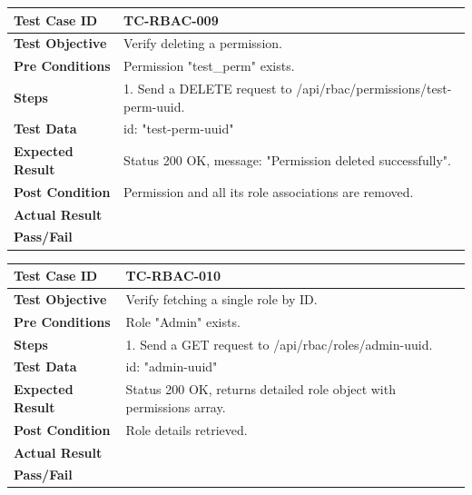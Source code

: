 \begin{longtable}{|p{}|p{}|}
\hline
\textbf{Test Case ID} & TC-RBAC-009 \\ \hline
\textbf{Test Objective} & Verify deleting a permission. \\ \hline
\textbf{Pre Conditions} & Permission "test_perm" exists. \\ \hline
\textbf{Steps} & 
1. Send a DELETE request to /api/rbac/permissions/test-perm-uuid. \\ \hline
\textbf{Test Data} & id: "test-perm-uuid" \\ \hline
\textbf{Expected Result} & Status 200 OK, message: "Permission deleted successfully". \\ \hline
\textbf{Post Condition} & Permission and all its role associations are removed. \\ \hline
\textbf{Actual Result} &  \\ \hline
\textbf{Pass/Fail} &  \\ \hline
\end{longtable}

\begin{longtable}{|p{}|p{}|}
\hline
\textbf{Test Case ID} & TC-RBAC-010 \\ \hline
\textbf{Test Objective} & Verify fetching a single role by ID. \\ \hline
\textbf{Pre Conditions} & Role "Admin" exists. \\ \hline
\textbf{Steps} & 
1. Send a GET request to /api/rbac/roles/admin-uuid. \\ \hline
\textbf{Test Data} & id: "admin-uuid" \\ \hline
\textbf{Expected Result} & Status 200 OK, returns detailed role object with permissions array. \\ \hline
\textbf{Post Condition} & Role details retrieved. \\ \hline
\textbf{Actual Result} &  \\ \hline
\textbf{Pass/Fail} &  \\ \hline
\end{longtable}